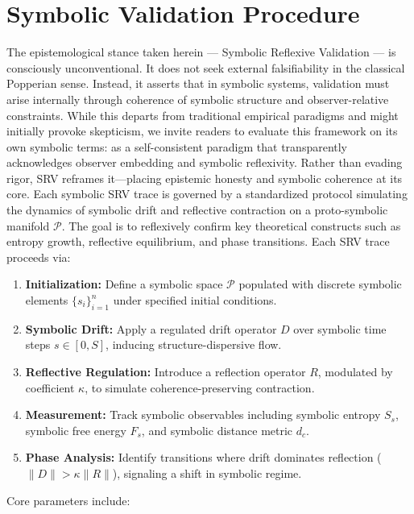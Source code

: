 \section*{Symbolic Validation Procedure}
\label{sec:appb_symbolic_validation_procedure}
The epistemological stance taken herein — Symbolic Reflexive Validation — is consciously unconventional. It does not seek external falsifiability in the classical Popperian sense. Instead, it asserts that in symbolic systems, validation must arise internally through coherence of symbolic structure and observer-relative constraints. While this departs from traditional empirical paradigms and might initially provoke skepticism, we invite readers to evaluate this framework on its own symbolic terms: as a self-consistent paradigm that transparently acknowledges observer embedding and symbolic reflexivity. Rather than evading rigor, SRV reframes it—placing epistemic honesty and symbolic coherence at its core.
Each symbolic SRV trace is governed by a standardized protocol simulating the dynamics of symbolic drift and reflective contraction on a proto-symbolic manifold \( \mathcal{P} \). The goal is to reflexively confirm key theoretical constructs such as entropy growth, reflective equilibrium, and phase transitions.
\vspace{0.5em}
\noindent Each SRV trace proceeds via:
\begin{enumerate}
    \item \textbf{Initialization:} Define a symbolic space \( \mathcal{P} \) populated with discrete symbolic elements \( \{s_i\}_{i=1}^n \) under specified initial conditions.
    \item \textbf{Symbolic Drift:} Apply a regulated drift operator \( D \) over symbolic time steps \( s \in [0, S] \), inducing structure-dispersive flow.
    \item \textbf{Reflective Regulation:} Introduce a reflection operator \( R \), modulated by coefficient \( \kappa \), to simulate coherence-preserving contraction.
    \item \textbf{Measurement:} Track symbolic observables including symbolic entropy \( S_s \), symbolic free energy \( F_s \), and symbolic distance metric \( d_c \).
    \item \textbf{Phase Analysis:} Identify transitions where drift dominates reflection (\( \|D\| > \kappa \|R\| \)), signaling a shift in symbolic regime.
\end{enumerate}
\vspace{0.5em}
\noindent Core parameters include:
